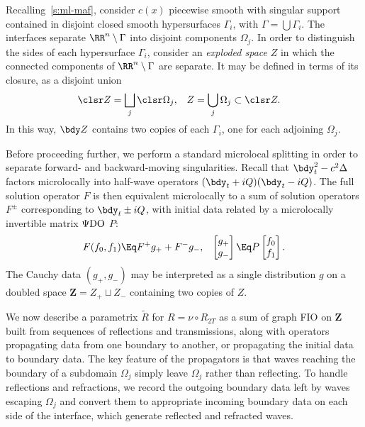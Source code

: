 \documentclass[10pt]{article}
\theoremstyle{plain}
\theoremstyle{definition}
\theoremstyle{remark}
\numberwithin{theorem}{section}
\numberwithin{example}{section}
\numberwithin{equation}{section}
\numberwithin{figure}{section}
\newcommand\sref[1]{\textsection\ref{#1}}					%
\let\d\bdy 						%
\newcommand\PsiDO{\ensuremath{\Psi\text{\normalfont DO}}}	%
\newcommand\eqml{\Eq}					%
\def \g{ \mathbf{g}}
\begin{document}
Recalling~\sref{s:ml-maf}, consider $c(x)$ piecewise smooth with singular support contained in disjoint closed smooth hypersurfaces $\Gamma_i$, with $\Gamma=\bigcup\Gamma_i$. The interfaces separate $\RR^n\setminus\Gamma$ into disjoint components $\Omega_j$. In order to distinguish the sides of each hypersurface $\Gamma_i$, consider an \emph{exploded space} $Z$ in which the connected components of $\RR^n\setminus\Gamma$ are separate. It may be defined in terms of its closure, as a disjoint union 
\begin{align*}
	\clsr Z &= \bigsqcup_{\smash[b]j} \clsr\Omega_j,
	&
	Z &= \bigcup_{\smash[b]j} \Omega_j\subset\clsr Z.
\end{align*}
In this way, $\bdy Z$ contains two copies of each $\Gamma_i$, one for each adjoining $\Omega_j$. 

Before proceeding further, we perform a standard microlocal splitting in order to separate forward- and backward-moving singularities.
Recall that $\d_t^2-c^2\Delta$ factors microlocally into half-wave operators $(\d_t+iQ)(\d_t-iQ)$.
The full solution operator $F$ is then equivalent microlocally to a sum of solution operators $F^\pm$ corresponding to $\d_t\pm iQ$, with initial data related by a microlocally invertible matrix \PsiDO{} $P$:
\begin{align}
	F(f_0,f_1) &\eqml F^+g_++F^-g_-,
	&
	\begin{bmatrix} g_+\\g_-\end{bmatrix}\eqml P\begin{bmatrix} f_0\\f_1\end{bmatrix}.
\end{align}
The Cauchy data $(g_+,g_-)$ may be interpreted as a single distribution $g$ on a doubled space $\mathbf Z=Z_+\sqcup Z_-$ containing two copies of $Z$.

We now describe a parametrix $\tilde R$ for $R=\nu\circ R_{2T}$ as a sum of graph FIO on $\mathbf Z$ built from sequences of reflections and transmissions, along with operators propagating data from one boundary to another, or propagating the initial data to boundary data. The key feature of the propagators is that waves reaching the boundary of a subdomain $\Omega_j$ simply leave $\Omega_j$ rather than reflecting. To handle reflections and refractions, we record the outgoing boundary data left by waves escaping $\Omega_j$ and convert them to appropriate incoming boundary data on each side of the interface, which generate reflected and refracted waves.
\end{document}

